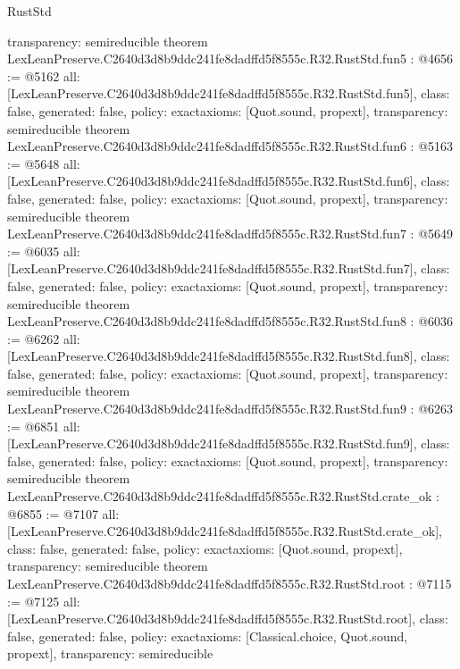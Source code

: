 \begin{lexlean}{RustStd}
\begin{coremodule}
{  transparency: semireducible
}
theorem LexLeanPreserve.C2640d3d8b9ddc241fe8dadffd5f8555c.R32.RustStd.fun5 : @4656 := @5162 {
  all: [LexLeanPreserve.C2640d3d8b9ddc241fe8dadffd5f8555c.R32.RustStd.fun5],
  class: false,
  generated: false,
  policy: exact{axioms: [Quot.sound, propext]},
  transparency: semireducible
}
theorem LexLeanPreserve.C2640d3d8b9ddc241fe8dadffd5f8555c.R32.RustStd.fun6 : @5163 := @5648 {
  all: [LexLeanPreserve.C2640d3d8b9ddc241fe8dadffd5f8555c.R32.RustStd.fun6],
  class: false,
  generated: false,
  policy: exact{axioms: [Quot.sound, propext]},
  transparency: semireducible
}
theorem LexLeanPreserve.C2640d3d8b9ddc241fe8dadffd5f8555c.R32.RustStd.fun7 : @5649 := @6035 {
  all: [LexLeanPreserve.C2640d3d8b9ddc241fe8dadffd5f8555c.R32.RustStd.fun7],
  class: false,
  generated: false,
  policy: exact{axioms: [Quot.sound, propext]},
  transparency: semireducible
}
theorem LexLeanPreserve.C2640d3d8b9ddc241fe8dadffd5f8555c.R32.RustStd.fun8 : @6036 := @6262 {
  all: [LexLeanPreserve.C2640d3d8b9ddc241fe8dadffd5f8555c.R32.RustStd.fun8],
  class: false,
  generated: false,
  policy: exact{axioms: [Quot.sound, propext]},
  transparency: semireducible
}
theorem LexLeanPreserve.C2640d3d8b9ddc241fe8dadffd5f8555c.R32.RustStd.fun9 : @6263 := @6851 {
  all: [LexLeanPreserve.C2640d3d8b9ddc241fe8dadffd5f8555c.R32.RustStd.fun9],
  class: false,
  generated: false,
  policy: exact{axioms: [Quot.sound, propext]},
  transparency: semireducible
}
theorem LexLeanPreserve.C2640d3d8b9ddc241fe8dadffd5f8555c.R32.RustStd.crate_ok : @6855 := @7107 {
  all: [LexLeanPreserve.C2640d3d8b9ddc241fe8dadffd5f8555c.R32.RustStd.crate_ok],
  class: false,
  generated: false,
  policy: exact{axioms: [Quot.sound, propext]},
  transparency: semireducible
}
theorem LexLeanPreserve.C2640d3d8b9ddc241fe8dadffd5f8555c.R32.RustStd.root : @7115 := @7125 {
  all: [LexLeanPreserve.C2640d3d8b9ddc241fe8dadffd5f8555c.R32.RustStd.root],
  class: false,
  generated: false,
  policy: exact{axioms: [Classical.choice, Quot.sound, propext]},
  transparency: semireducible
}


\end{coremodule}
\end{lexlean}

